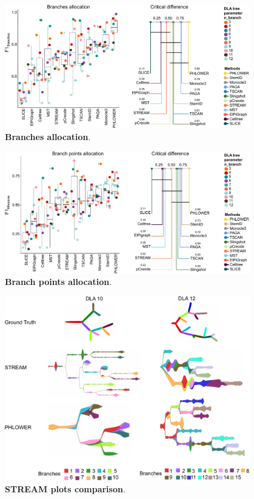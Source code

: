 \begin{figure}[!ht]
	\centering
	\includegraphics[width=0.95\textwidth]{F1branches/fig}
	\vspace{0.1cm}
	\caption[Branches allocation]{
	\textbf{Branches allocation}.}
	\label{fig:f1branches}
\end{figure}

\begin{figure}[!ht]
	\centering
	\includegraphics[width=0.95\textwidth]{F1milestone/fig}
	\vspace{0.1cm}
	\caption[Branch points allocation]{
	\textbf{Branch points allocation}.}
	\label{fig:f1milestone}
\end{figure}

\begin{figure}[!ht]
	\centering
	\includegraphics[width=0.95\textwidth]{PHLOWER_STREAM_layout/fig}
	\vspace{0.1cm}
	\caption[STREAM plots comparison]{
	\textbf{STREAM plots comparison}.}
	\label{fig:PHLOWER_STREAM}
\end{figure}




